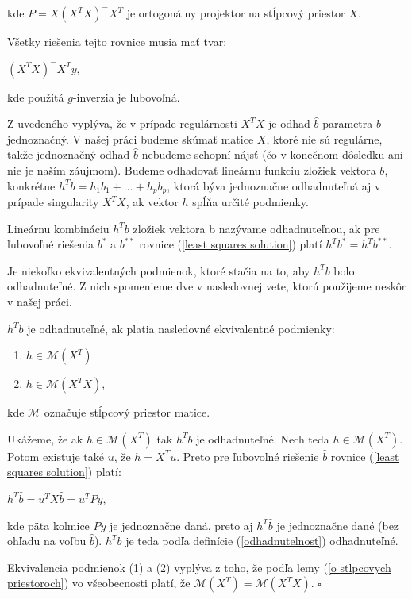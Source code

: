 kde $P = X (X^T X)^- X^T$ je ortogonálny projektor na stĺpcový priestor $X$.

Všetky riešenia tejto rovnice musia mať tvar:

\begin{center}
$
(X^T X)^- X^T y
$,
\end{center}

kde použitá $g$-inverzia je ľubovoľná.

Z uvedeného vyplýva, že v prípade regulárnosti $X^T X$ je odhad $\hat{b}$ parametra $b$ jednoznačný. 
V našej práci budeme skúmať matice $X$, ktoré nie sú regulárne, 
takže jednoznačný odhad $\hat{b}$ nebudeme schopní nájsť (čo v konečnom dôsledku ani nie je naším záujmom).
Budeme odhadovať lineárnu funkciu zložiek vektora $b$, konkrétne $h^T b = h_1 b_1 + \ldots + h_p b_p$,
ktorá býva jednoznačne odhadnuteľná aj v prípade singularity $X^T X$, ak vektor $h$ spĺňa určité podmienky. 

\begin{defin}
\label{odhadnutelnost}
Lineárnu kombináciu $h^T b$ zložiek vektora b nazývame odhadnuteľnou,
ak pre ľubovoľné riešenia $b^*$ a $b^{**}$ rovnice (\ref{least squares solution}) platí $h^T b^* = h^T b^{**}$.
\end{defin}

Je niekoľko ekvivalentných podmienok, ktoré stačia na to, aby $h^T b$ bolo odhadnuteľné. 
Z nich spomenieme dve v nasledovnej vete, ktorú použijeme neskôr v našej práci.

\begin{theorem}
\label{veta1}
$h^T b$ je odhadnuteľné, ak platia nasledovné ekvivalentné podmienky:
\begin{enumerate}
  \item $h \in \mathcal{M}(X^T)$
  \item $h \in \mathcal{M}(X^T X)$,
\end{enumerate}
kde $\mathcal{M}$ označuje stĺpcový priestor matice.
\end{theorem}

\begin{dokaz}
Ukážeme, že ak $h \in \mathcal{M}(X^T)$ tak $h^T b$ je odhadnuteľné.
Nech teda $h \in \mathcal{M}(X^T)$. Potom existuje také $u$, že $h = X^T u$.
Preto pre ľubovoľné riešenie $\hat{b}$ rovnice (\ref{least squares solution}) platí:

\begin{center}
$
h^T \hat{b} = u^T X \hat{b} = u^T P y
$,
\end{center}

kde päta kolmice $Py$ je jednoznačne daná, preto aj $h^T \hat{b}$ je jednoznačne dané (bez ohľadu na voľbu $\hat{b}$).
$h^T b$ je teda podľa definície (\ref{odhadnutelnost}) odhadnuteľné.

Ekvivalencia podmienok (1) a (2) vyplýva z toho, že podľa lemy (\ref{o stlpcovych priestoroch}) vo všeobecnosti platí, že $\mathcal{M}(X^T) = \mathcal{M}(X^T X)$.
$\square$
\end{dokaz}

